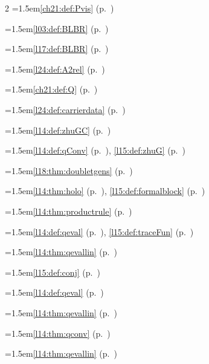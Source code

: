 \begin{multicols}{2}
\hangindent=1.5em\quad \ref{ch21:def:Pvis} (p.~\pageref{ch21:def:Pvis})\par
\hangindent=1.5em\quad \ref{l03:def:BLBR} (p.~\pageref{l03:def:BLBR})\par
\hangindent=1.5em\quad \ref{l17:def:BLBR} (p.~\pageref{l17:def:BLBR})\par
\par{}\par\nopagebreak\smallskip
\hangindent=1.5em\quad \ref{l24:def:A2rel} (p.~\pageref{l24:def:A2rel})\par
\hangindent=1.5em\quad \ref{ch21:def:Q} (p.~\pageref{ch21:def:Q})\par
\hangindent=1.5em\quad \ref{l24:def:carrierdata} (p.~\pageref{l24:def:carrierdata})\par
\hangindent=1.5em\quad \ref{l14:def:zhuGC} (p.~\pageref{l14:def:zhuGC})\par
\hangindent=1.5em\quad \ref{l14:def:qConv} (p.~\pageref{l14:def:qConv}), \ref{l15:def:zhuG} (p.~\pageref{l15:def:zhuG})\par
\hangindent=1.5em\quad \ref{l18:thm:doubletgens} (p.~\pageref{l18:thm:doubletgens})\par
\hangindent=1.5em\quad \ref{l14:thm:holo} (p.~\pageref{l14:thm:holo}), \ref{l15:def:formalblock} (p.~\pageref{l15:def:formalblock})\par
\hangindent=1.5em\quad \ref{l14:thm:productrule} (p.~\pageref{l14:thm:productrule})\par
\hangindent=1.5em\quad \ref{l14:def:qeval} (p.~\pageref{l14:def:qeval}), \ref{l15:def:traceFun} (p.~\pageref{l15:def:traceFun})\par
\hangindent=1.5em\quad \ref{l14:thm:qevallin} (p.~\pageref{l14:thm:qevallin})\par
\hangindent=1.5em\quad \ref{l15:def:conj} (p.~\pageref{l15:def:conj})\par
\hangindent=1.5em\quad \ref{l14:def:qeval} (p.~\pageref{l14:def:qeval})\par
\hangindent=1.5em\quad \ref{l14:thm:qevallin} (p.~\pageref{l14:thm:qevallin})\par
\hangindent=1.5em\quad \ref{l14:thm:qconv} (p.~\pageref{l14:thm:qconv})\par
\hangindent=1.5em\quad \ref{l14:thm:qevallin} (p.~\pageref{l14:thm:qevallin})\par

\end{multicols}
